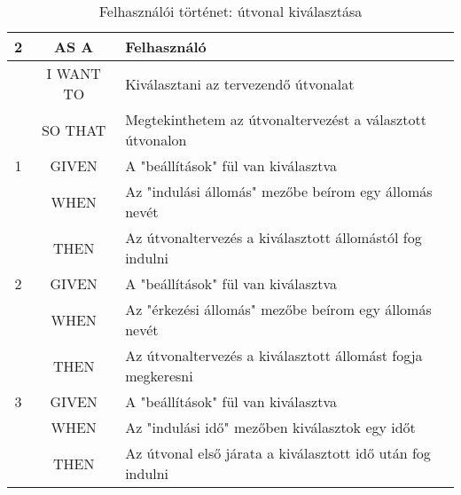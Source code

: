 \begin{table}[H]
    \centering
    \begin{tabular}{|c|c|p{10cm}|}
    \hline
    \textbf{2}
    & AS A          & Felhasználó \\ \hline
    & I WANT TO     & Kiválasztani az tervezendő útvonalat \\ \hline
    & SO THAT       & Megtekinthetem az útvonaltervezést a választott útvonalon \\ \hline
    \hline
    1 & GIVEN   & A "beállítások" fül van kiválasztva \\ \hline
    & WHEN    & Az "indulási állomás" mezőbe beírom egy állomás nevét \\ \hline
    & THEN    & Az útvonaltervezés a kiválasztott állomástól fog indulni \\ \hline
    \hline
    2 & GIVEN   & A "beállítások" fül van kiválasztva \\ \hline
    & WHEN    & Az "érkezési állomás" mezőbe beírom egy állomás nevét \\ \hline
    & THEN    & Az útvonaltervezés a kiválasztott állomást fogja megkeresni \\ \hline
    \hline
    3 & GIVEN   & A "beállítások" fül van kiválasztva \\ \hline
    & WHEN    & Az "indulási idő" mezőben kiválasztok egy időt \\ \hline
    & THEN    & Az útvonal első járata a kiválasztott idő után fog indulni \\ \hline
    \end{tabular}
    \caption{Felhasználói történet: útvonal kiválasztása}
    \label{tab:user-stories-route}
\end{table}


